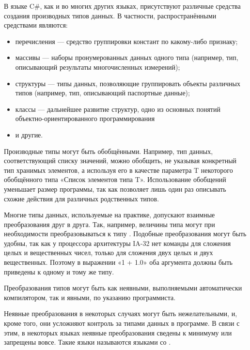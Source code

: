 
В языке C\#, как и во многих других языках, присутствуют различные
средства создания производных типов данных. В частности, распространёнными
средствами являются:
\begin{itemize}
\item перечисления — средство группировки констант по какому-либо
  признаку;
\item массивы — наборы пронумерованных данных одного типа (например,
  тип, описывающий результаты многочисленных измерений);
\item структуры — типы данных, позволяющие группировать объекты
  различных типов (например, тип, описывающий паспортные данные);
\item классы — дальнейшее развитие структур, одно из основных понятий
  объектно-ориентированного программирования
\item и другие.
\end{itemize}


Производные типы могут быть обобщёнными. Например, тип данных,
соответствующий списку значений, можно обобщить, не указывая конкретный
тип хранимых элементов, а используя его в качестве параметра T
некоторого обобщённого типа «Список элементов типа T». Использование
обобщений уменьшает размер программы, так как позволяет лишь один раз
описывать схожие действия для различных родственных типов.


Многие типы данных, используемые на практике, допускают взаимные
преобразования друг в друга. Так, например, величины типа 
могут при необходимости преобразовываться к типу
. Подобные преобразования могут быть удобны, так как у
процессора архитектуры IA-32 нет команды для сложения целых и
вещественных чисел, только для сложения двух целых и двух
вещественных. Поэтому в выражении «1 + 1.0» оба аргумента должны быть
приведены к одному и тому же типу.

Преобразования типов могут быть как неявными, выполняемыми
автоматически компилятором, так и явными, по указанию программиста.

Неявные преобразования в некоторых случаях могут быть нежелательными,
и, кроме того, они усложняют контроль за типами данных в программе.  В
связи с этим, в некоторых языках неявные преобразования сведены к
минимуму или запрещены вовсе. Такие языки называются языками со
.

